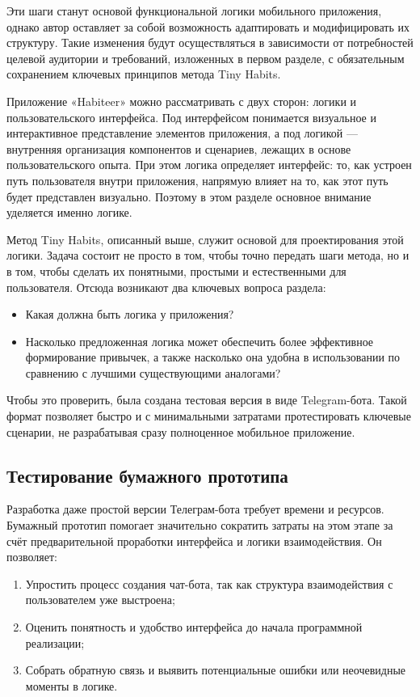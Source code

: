 \documentclass[pdflatex,sn-mathphys-num]{sn-jnl}%
\theoremstyle{thmstyleone}%
\theoremstyle{thmstyletwo}%
\theoremstyle{thmstylethree}%
\begin{document}
Эти шаги станут основой функциональной логики мобильного приложения, однако автор оставляет за собой возможность адаптировать и модифицировать их структуру. Такие изменения будут осуществляться в зависимости от потребностей целевой аудитории и требований, изложенных в первом разделе, с обязательным сохранением ключевых принципов метода Tiny Habits. 

Приложение «Habiteer» можно рассматривать с двух сторон: логики и пользовательского интерфейса. Под интерфейсом понимается визуальное и интерактивное представление элементов приложения, а под логикой — внутренняя организация компонентов и сценариев, лежащих в основе пользовательского опыта. При этом логика определяет интерфейс: то, как устроен путь пользователя внутри приложения, напрямую влияет на то, как этот путь будет представлен визуально. Поэтому в этом разделе основное внимание уделяется именно логике.

Метод Tiny Habits, описанный выше, служит основой для проектирования этой логики. Задача состоит не просто в том, чтобы точно передать шаги метода, но и в том, чтобы сделать их понятными, простыми и естественными для пользователя. Отсюда возникают два ключевых вопроса раздела:

\begin{itemize}
    \item Какая должна быть логика у приложения?
    \item Насколько предложенная логика может обеспечить более эффективное формирование привычек, а также насколько она удобна в использовании по сравнению с лучшими существующими аналогами?
\end{itemize}

Чтобы это проверить, была создана тестовая версия в виде Telegram-бота. Такой формат позволяет быстро и с минимальными затратами протестировать ключевые сценарии, не разрабатывая сразу полноценное мобильное приложение.

\subsection{Тестирование бумажного прототипа}

Разработка даже простой версии Телеграм-бота требует времени и ресурсов. Бумажный прототип помогает значительно сократить затраты на этом этапе за счёт предварительной проработки интерфейса и логики взаимодействия. Он позволяет:

\begin{enumerate}
\item Упростить процесс создания чат-бота, так как структура взаимодействия с пользователем уже выстроена;
\item Оценить понятность и удобство интерфейса до начала программной реализации;
\item Собрать обратную связь и выявить потенциальные ошибки или неочевидные моменты в логике.
\end{enumerate}
\end{document}
